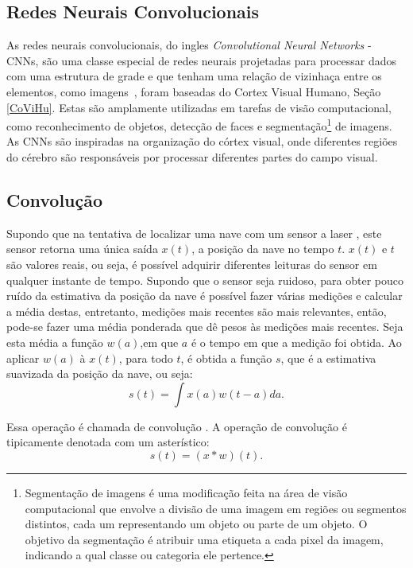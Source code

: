 \subsection{Redes Neurais Convolucionais}
\label{redesConvolucionais}
As redes neurais convolucionais, do ingles \textit{Convolutional Neural Networks} - CNNs, são uma classe especial de redes neurais projetadas para processar dados com uma estrutura de grade e que tenham uma relação de vizinhaça entre os elementos, como imagens~\cite{medium}, foram baseadas do Cortex Visual Humano, Seção \ref{CoViHu}. Estas são amplamente utilizadas em tarefas de visão computacional, como reconhecimento de objetos, detecção de faces e segmentação\footnote{Segmentação de imagens é uma modificação feita na área de  visão computacional que envolve a divisão de uma imagem em regiões ou segmentos distintos, cada um representando um objeto ou parte de um objeto. O objetivo da segmentação é atribuir uma etiqueta a cada pixel da imagem, indicando a qual classe ou categoria ele pertence.} de imagens. As CNNs são inspiradas na organização do córtex visual, onde diferentes regiões do cérebro são responsáveis por processar diferentes partes do campo visual.

\subsection{Convolução}
\begin{exemplo}
\label{ex:convolucao}
Supondo que na tentativa de localizar uma nave com um sensor a laser \cite{Goodfellow-et-al-2016}, este sensor retorna uma única saída $x(t)$, a posição da nave no tempo $t$. $x(t)$ e $t$ são valores reais, ou seja, é possível adquirir diferentes leituras do sensor em qualquer instante de tempo. Supondo que o sensor seja ruidoso, para obter pouco ruído da estimativa da posição da nave é possível fazer várias medições e calcular a média destas, entretanto, medições mais recentes são mais relevantes, então, pode-se fazer uma média ponderada que dê pesos às medições mais recentes. Seja esta média a função $w(a)$,em que $a$ é o tempo em que a medição foi obtida. Ao aplicar $w(a)$ à $x(t)$, para todo $t$, é obtida a função $s$, que é a estimativa suavizada da posição da nave, ou seja:
\begin{equation}
    s(t) = \int x(a)w(t-a)da.
\end{equation}
\end{exemplo}
Essa operação é chamada de convolução \cite{convolucao}. A operação de convolução é tipicamente denotada com um asterístico:
$$
s(t) = (x*w)(t).
$$

